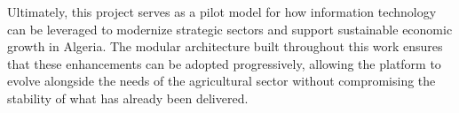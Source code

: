 Ultimately, this project serves as a pilot model for how information technology can be leveraged to modernize strategic sectors and support sustainable economic growth in Algeria. The modular architecture built throughout this work ensures that these enhancements can be adopted progressively, allowing the platform to evolve alongside the needs of the agricultural sector without compromising the stability of what has already been delivered.